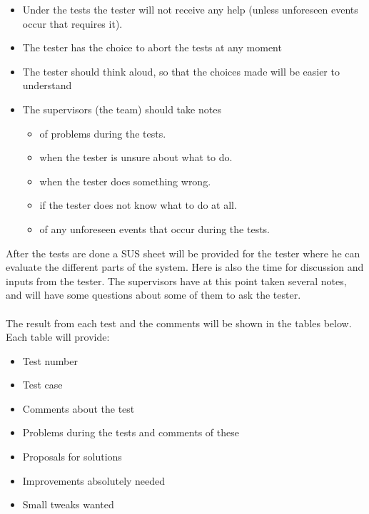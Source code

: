 \begin{itemize} \setlength{\itemsep}{0cm}\setlength{\parskip}{0cm}
	\item Under the tests the tester will not receive any help (unless unforeseen events occur that requires it).
	\item The tester has the choice to abort the tests at any moment
	\item The tester should think aloud, so that the choices made will be easier to understand
	\item The supervisors (the team) should take notes 
	\begin{itemize} \setlength{\itemsep}{0cm}\setlength{\parskip}{0cm}
		\item of problems during the tests.
		\item when the tester is unsure about what to do.
		\item when the tester does something wrong.
		\item if the tester does not know what to do at all.
		\item of any unforeseen events that occur during the tests.
	\end{itemize}
\end{itemize}
\noindent
After the tests are done a SUS sheet will be provided for the tester where he can evaluate the different parts of the system. Here is also the time for discussion and inputs from the tester. The supervisors have at this point taken several notes, and will have some questions about some of them to ask the tester.\\
\\
The result from each test and the comments will be shown in the tables below. Each table will provide:\\
\begin{itemize} \setlength{\itemsep}{0cm}\setlength{\parskip}{0cm}
	\item Test number
	\item Test case
	\item Comments about the test
	\item Problems during the tests and comments of these
	\item Proposals for solutions
	\item Improvements absolutely needed
	\item Small tweaks wanted
\end{itemize}


